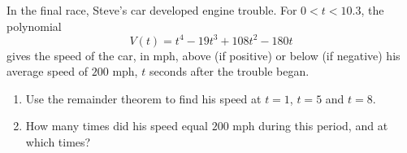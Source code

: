 In the final race, Steve's car developed engine trouble. For $0<t<10.3$, the polynomial
\[V(t)=t^4-19t^3+108t^2-180t\]
gives the speed of the car, in mph, above (if positive) or below (if negative) his average speed of $200$ mph, $t$ seconds after the trouble began.
\begin{enumerate}
\item[(a)] Use the remainder theorem to find his speed at $t=1$, $t=5$ and $t=8$.
\item[(b)] How many times did his speed equal $200$ mph during this period, and at which times?
\end{enumerate}
